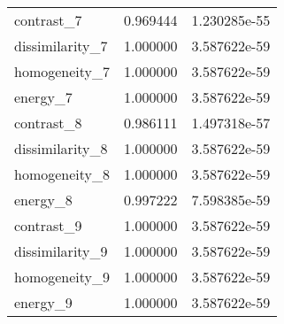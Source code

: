 \begin{tabular}{lrr}
contrast\_7      &  0.969444 &  1.230285e-55 \\
dissimilarity\_7 &  1.000000 &  3.587622e-59 \\
homogeneity\_7   &  1.000000 &  3.587622e-59 \\
energy\_7        &  1.000000 &  3.587622e-59 \\
contrast\_8      &  0.986111 &  1.497318e-57 \\
dissimilarity\_8 &  1.000000 &  3.587622e-59 \\
homogeneity\_8   &  1.000000 &  3.587622e-59 \\
energy\_8        &  0.997222 &  7.598385e-59 \\
contrast\_9      &  1.000000 &  3.587622e-59 \\
dissimilarity\_9 &  1.000000 &  3.587622e-59 \\
homogeneity\_9   &  1.000000 &  3.587622e-59 \\
energy\_9        &  1.000000 &  3.587622e-59 \\
\bottomrule
\end{tabular}

